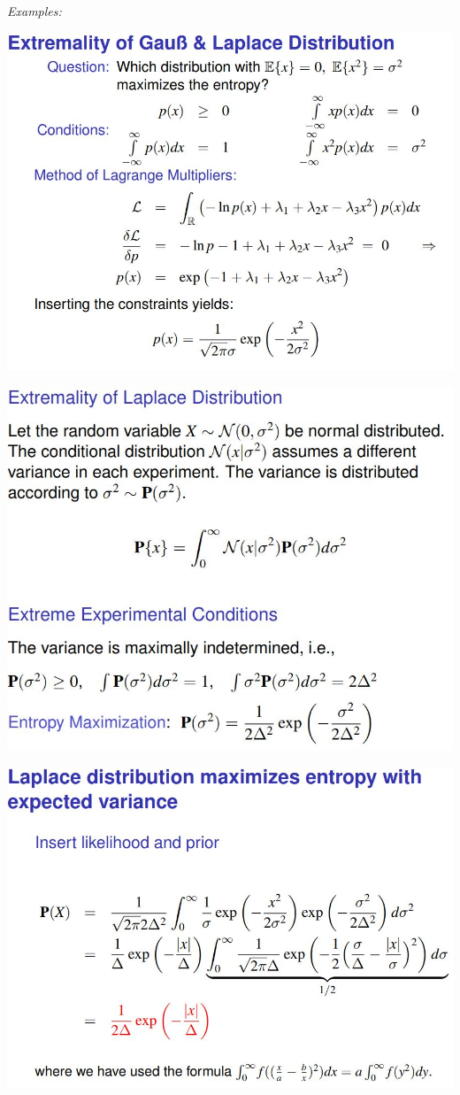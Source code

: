 \documentclass[9pt,parskip]{scrartcl}
\begin{document}
\begin{multicols*}{4}
\textit{Examples:}

\begin{center}
\includegraphics[width=0.9\linewidth]{pictures/maxEntropyExample1.jpg}

\includegraphics[width=0.9\linewidth]{pictures/maxEntropyExample2.jpg}

\includegraphics[width=0.9\linewidth]{pictures/maxEntropyExample3.jpg}
\end{center}



\end{multicols*}
\end{document}
